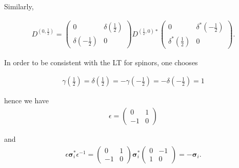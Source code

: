 \documentclass[12pt]{beamer}
\begin{document}
\begin{frame}
Similarly,

\begin{align}
D^{(0,\frac{1}{2})}=\begin{pmatrix}0&\delta(\frac{1}{2})\\\delta(-\frac{1}{2})&0\end{pmatrix}D^{(\frac{1}{2},0)*}\begin{pmatrix}0&\delta^*(-\frac{1}{2})\\\delta^*(\frac{1}{2})&0\end{pmatrix}.
\end{align}

In order to be consistent with the LT for spinors, one chooses

\begin{align}
\gamma(\frac{1}{2})=\delta(\frac{1}{2})=-\gamma(-\frac{1}{2})=-\delta(-\frac{1}{2})=1
\end{align}

\noindent hence we have\\[-10pt]

\begin{align}
\epsilon=\begin{pmatrix}0&1\\-1&0\end{pmatrix}
\end{align}

\noindent and\\[-10pt]

\begin{align}
\epsilon\bm{\sigma}_i^*\epsilon^{-1}=\begin{pmatrix}0&1\\-1&0\end{pmatrix} \bm{\sigma}_i^* \begin{pmatrix}0&-1\\1&0\end{pmatrix}=-\bm{\sigma}_i.
\end{align}
\end{frame}
\end{document}
